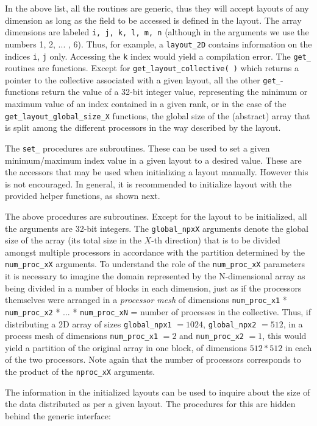 \documentclass[]{report}   %
\begin{document}
In the above list, all the routines are generic, thus they will accept layouts of any dimension as long as the field to be accessed is defined in the layout. The array dimensions are labeled \verb+i, j, k, l, m, n+ (although in the arguments we use the numbers 1, 2, ... , 6). Thus, for example, a \verb+layout_2D+ contains information on the indices \verb+i+, \verb+j+ only. Accessing the \verb+k+ index would yield a compilation error. The \verb+get_+ routines are functions. Except for \verb+get_layout_collective( )+ which returns a pointer to the collective associated with a given layout, all the other \verb+get_+-functions return the value of a 32-bit integer value, representing the minimum or maximum value of an index contained in a given rank, or in the case of the \verb+get_layout_global_size_X+ functions, the global size of the (abstract) array that is split among the different processors in the way described by the layout.

The \verb+set_+ procedures are subroutines. These can be used to set a given minimum/maximum index value in a given layout to a desired value. These are the accessors that may be used when initializing a layout manually. However this is not encouraged. In general, it is recommended to initialize layout with the provided helper functions, as shown next.


The above procedures are subroutines. Except for the layout to be initialized, all the arguments are 32-bit integers. The \verb+global_npxX+ arguments denote the global size of the array (its total size in the $X$-th direction) that is to be divided amongst multiple processors in accordance with the partition determined by the \verb+num_proc_xX+ arguments. To understand the role of the \verb+num_proc_xX+ parameters it is necessary to imagine the domain represented by the N-dimensional array as being divided in a number of blocks in each dimension, just as if the processors themselves were arranged in a \emph{processor mesh} of dimensions \verb+num_proc_x1+ * \verb+num_proc_x2+ * ...  * \verb+num_proc_xN+ = number of processes in the collective. Thus, if distributing a 2D array of sizes \verb+global_npx1+ $ = 1024$, \verb+global_npx2+ $= 512$, in a process mesh of dimensions \verb+num_proc_x1+ $= 2$ and \verb+num_proc_x2+ $= 1$, this would yield a partition of the original array in one block, of dimensions $512 * 512$ in each of the two processors. Note again that the number of processors corresponds to the product of the \verb+nproc_xX+ arguments.

The information in the initialized layouts can be used to inquire about the size of the data distributed as per a given layout. The procedures for this are hidden behind the generic interface:
\end{document}
